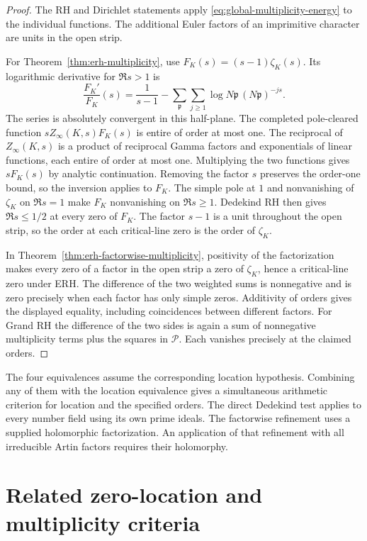 \documentclass[11pt]{amsart}
\theoremstyle{definition}
\theoremstyle{remark}
\numberwithin{equation}{section}
\begin{document}
\begin{proof}
The RH and Dirichlet statements apply
\eqref{eq:global-multiplicity-energy} to the individual functions.
The additional Euler factors of an imprimitive character are units
in the open strip.

For Theorem~\ref{thm:erh-multiplicity}, use \(F_K(s)=(s-1)\zeta_K(s)\).
Its logarithmic derivative for \(\Re s>1\) is
\[
 \frac{F_K'}{F_K}(s)=\frac{1}{s-1}
    -\sum_{\mathfrak p}\sum_{j\ge1}
      \log N\mathfrak p\,(N\mathfrak p)^{-js}.
\]
The series is absolutely convergent in this half-plane. The completed
pole-cleared function \(s Z_\infty(K,s)F_K(s)\) is entire of order at
most one. The reciprocal of \(Z_\infty(K,s)\) is a product of
reciprocal Gamma factors and exponentials of linear functions, each
entire of order at most one. Multiplying the two functions gives
\(s F_K(s)\) by analytic continuation. Removing the factor \(s\)
preserves the order-one bound, so the inversion applies to \(F_K\).
The simple pole at \(1\) and nonvanishing of \(\zeta_K\) on
\(\Re s=1\) make \(F_K\) nonvanishing on \(\Re s\ge1\).
Dedekind RH then gives \(\Re s\le1/2\) at every zero of \(F_K\).
The factor \(s-1\) is a unit throughout the open strip, so the
order at each critical-line zero is the order of \(\zeta_K\).

In Theorem~\ref{thm:erh-factorwise-multiplicity}, positivity of the
factorization makes every zero of a factor in the open strip a zero
of \(\zeta_K\), hence a critical-line zero under ERH.
The difference of the two weighted sums is nonnegative and is zero
precisely when each factor has only simple zeros. Additivity of
orders gives the displayed equality, including coincidences between
different factors. For Grand RH the difference of the two sides is
again a sum of nonnegative multiplicity terms plus the squares in
\(\mathcal P\). Each vanishes precisely at the claimed orders.
\end{proof}

The four equivalences assume the corresponding location hypothesis.
Combining any of them with the location equivalence gives a
simultaneous arithmetic criterion for location and the specified
orders. The direct Dedekind test applies to every number field using
its own prime ideals. The factorwise refinement uses a supplied
holomorphic factorization. An application of that refinement with
all irreducible Artin factors requires their holomorphy.

\section{Related zero-location and multiplicity criteria}\label{sec:comparison-criteria}
\label{sec:riesz-comparison}
\end{document}
